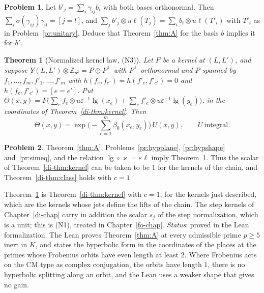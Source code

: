\documentclass[reqno]{amsart}
\newcounter{chap}
\theoremstyle{definition}
\newtheorem{problem}{Problem}[section]
\theoremstyle{plain}
\newtheorem{theorem}{Theorem}[section]
\theoremstyle{remark}
\newcommand{\Z}{\mathbb Z}
\renewcommand{\lg}{\operatorname{lg}}
\begin{document}
\begin{problem}\label{pr:frame}
Let \(b'_j=\sum_i\gamma_{ij}b_i\) with both bases orthonormal.  Then \(\sum_i\sigma(\gamma_{ij})\gamma_{il}=[j=l]\), and \(\sum_jb'_j\otimes u\ell(T_j)=\sum_ib_i\otimes u\ell(T'_i)\) with \(T'_i\) as in Problem~\ref{pr:unitary}.  Deduce that Theorem~\ref{thm:A} for the basis \(b\) implies it for \(b'\).
\end{problem}

\begin{theorem}[Normalized kernel law, (N3)]\label{thm:B}
Let \(F\) be a kernel at \((L,L')\), and suppose \(Y(L,L')\otimes\Z_{p^2}=P\oplus P^\perp\) with \(P^\perp\) orthonormal and \(P\) spanned by \(f_1,\dots,f_m,f'_1,\dots,f'_m\) with \(h(f_e,f_{e'})=h(f'_e,f'_{e'})=0\) and \(h(f_e,f'_{e'})=[e=e']\).  Put \(\Theta(x,y)=F\big(\sum_ef_e\otimes u\varepsilon^{-1}\lg(x_e)+\sum_ef'_e\otimes u\varepsilon^{-1}\lg(y_e)\big)\), in the coordinates of Theorem~\ref{di-thm:kernel}.  Then
\[
 \Theta(x,y)=\exp\Big(-\sum_{e=1}^m\beta_0(x_e,y_e)\Big)\,U(x,y),\qquad U\ \text{integral}.
\]
\end{theorem}

\begin{problem}\label{pr:N3}
Theorem~\ref{thm:A}, Problems~\ref{pr:hypplane}, \ref{pr:hypshape} and~\ref{pr:simeq}, and the relation \(\lg\circ\varkappa=\varepsilon\ell\) imply Theorem~\ref{thm:B}.  Thus the scalar of Theorem~\ref{di-thm:kernel} can be taken to be \(1\) for the kernels of the chain, and Theorem~\ref{di-thm:class} holds with \(c=1\).
\end{problem}

Theorem~\ref{thm:B} is Theorem~\ref{di-thm:kernel} with \(c=1\), for the kernels just described, which are the kernels whose jets define the lifts of the chain.  The step kernels of Chapter~\ref{di-chap} carry in addition the scalar \(s_j\) of the step normalization, which is a unit; this is (N1), treated in Chapter~\ref{fo-chap}.  \emph{Status}: proved in the Lean formalization.  The Lean proves Theorem~\ref{thm:A} at every admissible prime \(p\ge5\) inert in \(K\), and states the hyperbolic form in the coordinates of the places at the primes whose Frobenius orbits have even length at least \(2\).  Where Frobenius acts on the CM type as complex conjugation, the orbits have length \(1\), there is no hyperbolic splitting along an orbit, and the Lean uses a weaker shape that gives no gain.
\end{document}
